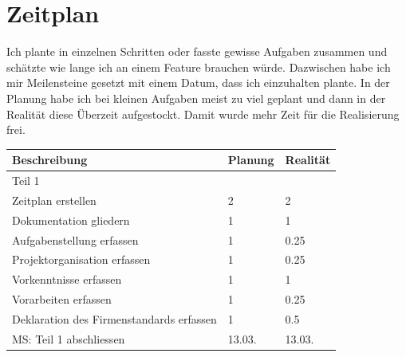 \section{Zeitplan}
Ich plante in einzelnen Schritten oder fasste gewisse Aufgaben zusammen und schätzte wie lange ich an einem Feature brauchen würde.
Dazwischen habe ich mir Meilensteine gesetzt mit einem Datum, dass ich einzuhalten plante.
In der Planung habe ich bei kleinen Aufgaben meist zu viel geplant und dann in der Realität diese Überzeit aufgestockt. Damit wurde mehr Zeit für die Realisierung frei.\\
\begin{table}[!ht]
\begin{center}
    \begin{tabular}{lll}
        \toprule Beschreibung & Planung & Realität \\
        \midrule Teil 1 & &\\
        \midrule Zeitplan erstellen & 2 & 2\\
        \midrule Dokumentation gliedern & 1 & 1\\
        \midrule Aufgabenstellung erfassen & 1 & 0.25\\
        \midrule Projektorganisation erfassen  & 1 & 0.25\\
        \midrule Vorkenntnisse erfassen & 1 & 1\\
        \midrule Vorarbeiten erfassen & 1 & 0.25 \\
        \midrule Deklaration des Firmenstandards erfassen & 1 & 0.5\\
        \midrule MS: Teil 1 abschliessen & 13.03. & 13.03.
     \end{tabular}
\end{center}
\end{table}
\clearpage
